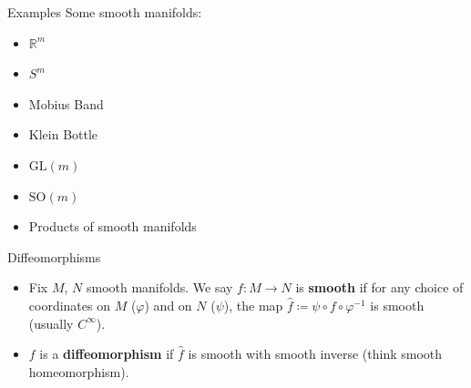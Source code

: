 \documentclass[usenames,dvipsnames]{beamer}
\theoremstyle{definition}
\theoremstyle{theorem}
\newcommand{\R}{\mathbb{R}}
\begin{document}
    \begin{frame}{Examples}
    Some smooth manifolds:
        \begin{itemize}
            \item $\R^m$
            \item $S^m$
            \item Mobius Band
            \item Klein Bottle
            \item $\mathrm{GL}(m)$
            \item $\mathrm{SO}(m)$
            \item Products of smooth manifolds
        \end{itemize}
    \end{frame}
        
    \begin{frame}{Diffeomorphisms}
        \begin{definition}
        \begin{itemize}
            \item Fix $M$, $N$ smooth manifolds.  We say $f\colon M \to N$ is \textbf{smooth} if for any choice of coordinates on $M$ ($\varphi$) and on $N$ ($\psi$), the map $\hat{f}\coloneqq \psi \circ f \circ \varphi^{-1}$ is smooth (usually $C^\infty$).
            \item $f$ is a \textbf{diffeomorphism} if $\hat{f}$ is smooth with smooth inverse (think smooth homeomorphism).
        \end{itemize}
        \end{definition}
    \end{frame}
    
\end{document}

